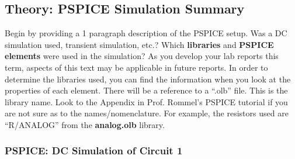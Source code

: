 \documentclass[11pt]{article}
\begin{document}
\subsection{Theory: PSPICE Simulation Summary}
Begin by providing a 1 paragraph description of the PSPICE setup. Was a DC simulation used, transient simulation, etc.?  Which \textbf{libraries} and \textbf{PSPICE elements} were used in the simulation? As you develop your lab reports this term, aspects of this text may be applicable in future reports.  In order to determine the libraries used, you can find the information when you look at the properties of each element.  There will be a reference to a ``.olb'' file.  This is the library name.   Look to the Appendix in Prof. Rommel's PSPICE tutorial if you are not sure as to the names/nomenclature.  For example, the resistors used are ``R/ANALOG'' from the \textbf{analog.olb} library. 
 
\subsubsection{PSPICE: DC Simulation of Circuit 1}
\end{document}
